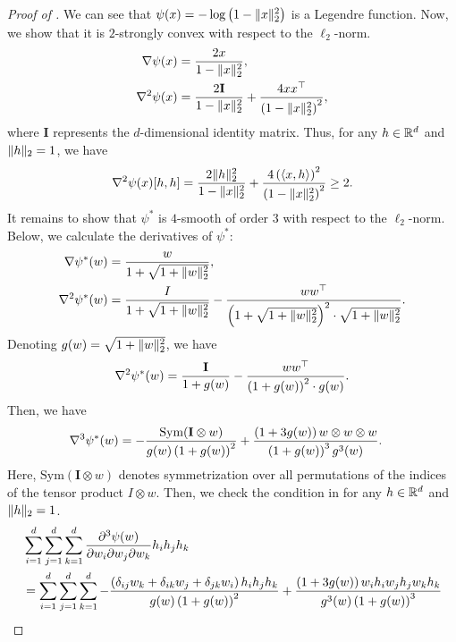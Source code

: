 \begin{proof}[Proof of ]
    We can see that $\psi(x)=-\log\left(1-\lVert x\rVert_2^2\right)$ is a Legendre function. Now, we show that it is $2$-strongly convex with respect to the $\ell_2$-norm.
    \begin{align*}
        \nabla\psi(x) &= \frac{2x}{1-\lVert x\rVert_2^2},\\
        \nabla^2\psi(x) &= \frac{2\mathbf{I}}{1-\lVert x\rVert_2^2}+\frac{4xx^\top}{\left(1-\lVert x\rVert_2^2\right)^2},
    \end{align*}
    where $\mathbf{I}$ represents the $d$-dimensional identity matrix.
    Thus, for any $h\in\mathbb{R}^d$ and $\lVert h\rVert_2=1$, we have
    \begin{align*}
        \nabla^2\psi(x)[h,h] = \frac{2\lVert h\rVert_2^2}{1-\lVert x\rVert_2^2}+\frac{4\left(\langle x, h \rangle\right)^2}{\left(1-\lVert x\rVert_2^2\right)^2}\ge 2.
    \end{align*}
    It remains to show that $\psi^*$ is $4$-smooth of order $3$ with respect to the $\ell_2$-norm. Below, we calculate the derivatives of $\psi^*$:
    \begin{align*}
    \nabla \psi^*(w)
    &=\frac{w}{1+\sqrt{1+\lVert w\rVert_2^2}},\\
    \nabla^2 \psi^*(w)
    &=\frac{I}{1+\sqrt{1+\lVert w\rVert_2^2}}-\frac{ww^\top}{\left(1+\sqrt{1+\lVert w\rVert_2^2}\right)^2\cdot \sqrt{1+\lVert w\rVert_2^2}}.
    \end{align*}
    Denoting $g(w)=\sqrt{1+\lVert w\rVert_2^2}$, we have
    \begin{align*}
    \nabla^2 \psi^*(w)
    =\frac{\mathbf{I}}{1+g(w)}-\frac{ww^\top}{\left(1+g(w)\right)^2\cdot g(w)}.
    \end{align*}
    Then, we have
    \begin{align*}
    \nabla^3 \psi^*(w)&= -\frac{\textrm{Sym}(\mathbf{I}\otimes w)}{g(w)\left(1+g(w)\right)^2} 
    + \frac{\left(1+3g(w)\right)w\otimes w\otimes w}{\left(1+g(w)\right)^3 g^3(w)}.
    \end{align*}
    Here, $\textrm{Sym}(\mathbf{I}\otimes w)$ denotes symmetrization over all permutations of the indices of the tensor product $I\otimes w$. 
    Then, we check the condition in  for any $h\in\mathbb{R}^d$ and $\lVert h\rVert_2=1$.
    \begin{align*}
    &\sum_{i=1}^d\sum^d_{j=1}\sum^d_{k=1}\frac{\partial^3\psi(w)}{\partial w_i\partial w_j\partial w_k}h_ih_jh_k \\& =\sum_{i=1}^d\sum^d_{j=1}\sum^d_{k=1} -\frac{\rbr{\delta_{ij}w_k+\delta_{ik}w_j+\delta_{jk}w_i}h_ih_jh_k}{g(w)\rbr{1+g(w)}^2}+\frac{\rbr{1+3g(w)}w_ih_i w_jh_j w_kh_k}{g^3(w)\rbr{1+g(w)}^3}\\

\end{align*}
\end{proof}
